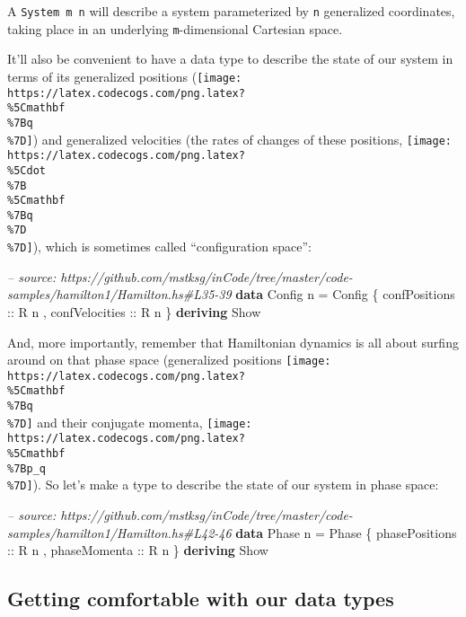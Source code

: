 \documentclass[]{article}
\newenvironment{Shaded}{}{}
\newcommand{\KeywordTok}[1]{\textcolor[rgb]{0.00,0.44,0.13}{\textbf{#1}}}
\newcommand{\DataTypeTok}[1]{\textcolor[rgb]{0.56,0.13,0.00}{#1}}
\newcommand{\CommentTok}[1]{\textcolor[rgb]{0.38,0.63,0.69}{\textit{#1}}}
\newcommand{\OtherTok}[1]{\textcolor[rgb]{0.00,0.44,0.13}{#1}}
\newcommand{\FunctionTok}[1]{\textcolor[rgb]{0.02,0.16,0.49}{#1}}
\newcommand{\NormalTok}[1]{#1}
\begin{document}
A \texttt{System\ m\ n} will describe a system parameterized by \texttt{n}
generalized coordinates, taking place in an underlying \texttt{m}-dimensional
Cartesian space.

It'll also be convenient to have a data type to describe the state of our system
in terms of its generalized positions
(\texttt{[image: https://latex.codecogs.com/png.latex?\\\%5Cmathbf\\\%7Bq\\\%7D]}) and
generalized velocities (the rates of changes of these positions,
\texttt{[image: https://latex.codecogs.com/png.latex?\\\%5Cdot\\\%7B\\\%5Cmathbf\\\%7Bq\\\%7D\\\%7D]}),
which is sometimes called ``configuration space'':

\begin{Shaded}
\begin{Highlighting}[]
\CommentTok{-- source: https://github.com/mstksg/inCode/tree/master/code-samples/hamilton1/Hamilton.hs#L35-39}
\KeywordTok{data} \DataTypeTok{Config}\NormalTok{ n }\FunctionTok{=} \DataTypeTok{Config}
\NormalTok{    \{}\OtherTok{ confPositions  ::} \DataTypeTok{R}\NormalTok{ n}
\NormalTok{    ,}\OtherTok{ confVelocities ::} \DataTypeTok{R}\NormalTok{ n}
\NormalTok{    \}}
  \KeywordTok{deriving} \DataTypeTok{Show}
\end{Highlighting}
\end{Shaded}

And, more importantly, remember that Hamiltonian dynamics is all about surfing
around on that phase space (generalized positions
\texttt{[image: https://latex.codecogs.com/png.latex?\\\%5Cmathbf\\\%7Bq\\\%7D]} and
their conjugate momenta,
\texttt{[image: https://latex.codecogs.com/png.latex?\\\%5Cmathbf\\\%7Bp\_q\\\%7D]}).
So let's make a type to describe the state of our system in phase space:

\begin{Shaded}
\begin{Highlighting}[]
\CommentTok{-- source: https://github.com/mstksg/inCode/tree/master/code-samples/hamilton1/Hamilton.hs#L42-46}
\KeywordTok{data} \DataTypeTok{Phase}\NormalTok{ n }\FunctionTok{=} \DataTypeTok{Phase}
\NormalTok{    \{}\OtherTok{ phasePositions ::} \DataTypeTok{R}\NormalTok{ n}
\NormalTok{    ,}\OtherTok{ phaseMomenta   ::} \DataTypeTok{R}\NormalTok{ n}
\NormalTok{    \}}
  \KeywordTok{deriving} \DataTypeTok{Show}
\end{Highlighting}
\end{Shaded}

\subsection{Getting comfortable with our data
types}\label{getting-comfortable-with-our-data-types}
\end{document}
